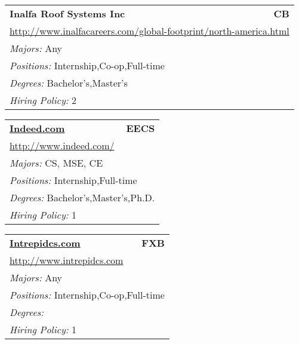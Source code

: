 \documentclass[twoside]{article}
\begin{document}
\begin{center}
\begin{multicols}{3}
\begin{FlushLeft}
\begin{minipage}{.9\columnwidth}
\end{minipage}
 
\begin{minipage}{.9\columnwidth}\begin{tabularx}{.95\columnwidth}{Xr}
                 {\Large\bf Inalfa Roof Systems Inc} & {\Large\bf CB}\\
    \multicolumn{2}{p{.95\columnwidth}}{\url{http://www.inalfacareers.com/global-footprint/north-america.html}}\\
    \multicolumn{2}{p{.95\columnwidth}}{\emph{Majors:} Any}\\
    \multicolumn{2}{p{.95\columnwidth}}{\emph{Positions:} Internship,Co-op,Full-time}\\
    \multicolumn{2}{p{.95\columnwidth}}{\emph{Degrees:} Bachelor's,Master's}\\
    \multicolumn{2}{p{.95\columnwidth}}{\emph{Hiring Policy:} 2}\\
    \end{tabularx}
    
\end{minipage}
 
\begin{minipage}{.9\columnwidth}\begin{tabularx}{.95\columnwidth}{Xr}
                 {\Large\bf \url{Indeed.com}} & {\Large\bf EECS}\\
    \multicolumn{2}{p{.95\columnwidth}}{\url{http://www.indeed.com/}}\\
    \multicolumn{2}{p{.95\columnwidth}}{\emph{Majors:} CS, MSE, CE}\\
    \multicolumn{2}{p{.95\columnwidth}}{\emph{Positions:} Internship,Full-time}\\
    \multicolumn{2}{p{.95\columnwidth}}{\emph{Degrees:} Bachelor's,Master's,Ph.D.}\\
    \multicolumn{2}{p{.95\columnwidth}}{\emph{Hiring Policy:} 1}\\
    \end{tabularx}
    
\end{minipage}
 
\begin{minipage}{.9\columnwidth}\begin{tabularx}{.95\columnwidth}{Xr}
                 {\Large\bf \url{Intrepidcs.com}} & {\Large\bf FXB}\\
    \multicolumn{2}{p{.95\columnwidth}}{\url{http://www.intrepidcs.com}}\\
    \multicolumn{2}{p{.95\columnwidth}}{\emph{Majors:} Any}\\
    \multicolumn{2}{p{.95\columnwidth}}{\emph{Positions:} Internship,Co-op,Full-time}\\
    \multicolumn{2}{p{.95\columnwidth}}{\emph{Degrees:} }\\
    \multicolumn{2}{p{.95\columnwidth}}{\emph{Hiring Policy:} 1}\\
    \end{tabularx}
    

\end{minipage}
\end{FlushLeft}
\end{multicols}
\end{center}
\end{document}
